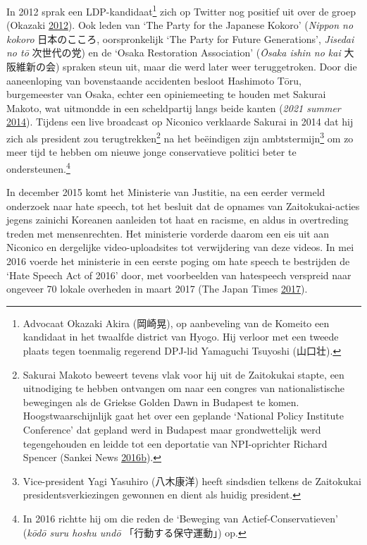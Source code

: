 \documentclass[10.5pt,dutch,]{article}
\begin{document}
In 2012 sprak een LDP-kandidaat\footnote{Advocaat Okazaki Akira
  (岡崎晃), op aanbeveling van de Komeito een kandidaat in het twaalfde
  district van Hyogo. Hij verloor met een tweede plaats tegen toenmalig
  regerend DPJ-lid Yamaguchi Tsuyoshi (山口壮).} zich op Twitter nog
positief uit over de groep (Okazaki
\protect\hyperlink{ref-okazakiux5ftwitterux5f2012}{2012}). Ook leden van
`The Party for the Japanese Kokoro' (\emph{Nippon no kokoro}
日本のこころ, oorspronkelijk `The Party for Future Generations',
\emph{Jisedai no tō} 次世代の党) en de `Osaka Restoration Association'
(\emph{Ōsaka ishin no kai} 大阪維新の会) spraken steun uit, maar die
werd later weer teruggetroken. Door die aaneenloping van bovenstaande
accidenten besloot Hashimoto Tōru, burgemeester van Osaka, echter een
opiniemeeting te houden met Sakurai Makoto, wat uitmondde in een
scheldpartij langs beide kanten (\emph{2021 summer}
\protect\hyperlink{ref-2021ux5fsummerux5fhashimotoux5f2014}{2014}).
Tijdens een live broadcast op Niconico verklaarde Sakurai in 2014 dat
hij zich als president zou terugtrekken\footnote{Sakurai Makoto beweert
  tevens vlak voor hij uit de Zaitokukai stapte, een uitnodiging te
  hebben ontvangen om naar een congres van nationalistische bewegingen
  als de Griekse Golden Dawn in Budapest te komen. Hoogstwaarschijnlijk
  gaat het over een geplande `National Policy Institute Conference' dat
  gepland werd in Budapest maar grondwettelijk werd tegengehouden en
  leidde tot een deportatie van NPI-oprichter Richard Spencer (Sankei News
  \protect\hyperlink{ref-sankeiux5fnewsux5ftokyochiji-senux5f2016-1}{2016}\protect\hyperlink{ref-sankeiux5fnewsux5ftokyochiji-senux5f2016-1}{b}).}
na het beëindigen zijn ambtstermijn\footnote{Vice-president Yagi
  Yasuhiro (八木康洋) heeft sindsdien telkens de Zaitokukai
  presidentsverkiezingen gewonnen en dient als huidig president.} om zo
meer tijd te hebben om nieuwe jonge conservatieve politici beter te
ondersteunen.\footnote{In 2016 richtte hij om die reden de `Beweging van
  Actief-Conservatieven' (\emph{kōdō suru hoshu undō}
  「行動する保守運動」) op.}

In december 2015 komt het Ministerie van Justitie, na een eerder vermeld
onderzoek naar hate speech, tot het besluit dat de opnames van
Zaitokukai-acties jegens zainichi Koreanen aanleiden tot haat en
racisme, en aldus in overtreding treden met mensenrechten. Het
ministerie vorderde daarom een eis uit aan Niconico en dergelijke
video-uploadsites tot verwijdering van deze videos. In mei 2016 voerde
het ministerie in een eerste poging om hate speech te bestrijden de
`Hate Speech Act of 2016' door, met voorbeelden van hatespeech verspreid
naar ongeveer 70 lokale overheden in maart 2017 (The Japan Times
\protect\hyperlink{ref-theux5fjapanux5ftimesux5fjusticeux5f2017}{2017}).
\end{document}
